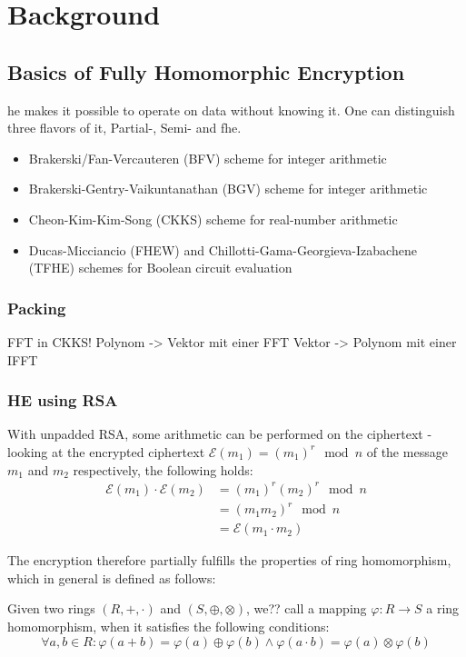 \chapter{Background}
\label{chap:background}

\section{Basics of Fully Homomorphic Encryption}
\gls{he} makes it possible to operate on data without knowing it.
One can distinguish three flavors of it, Partial-, Semi- and \gls{fhe}.

\begin{itemize}
    \item Brakerski/Fan-Vercauteren (BFV) scheme for integer arithmetic
    \item Brakerski-Gentry-Vaikuntanathan (BGV) scheme for integer arithmetic
    \item Cheon-Kim-Kim-Song (CKKS) scheme for real-number arithmetic
    \item Ducas-Micciancio (FHEW) and Chillotti-Gama-Georgieva-Izabachene (TFHE) schemes for Boolean circuit evaluation
\end{itemize}

\subsection{Packing}
FFT in CKKS!
Polynom -> Vektor mit einer FFT
Vektor -> Polynom mit einer IFFT

\subsection{HE using RSA}
With unpadded RSA, some arithmetic can be performed on the ciphertext - looking at the encrypted ciphertext $\mathcal{E}(m_1) = (m_1)^r \mod n$ of the message $m_1$ and $m_2$ respectively, the following holds:
\begin{align}
    \mathcal{E}(m_1) \cdot \mathcal{E}(m_2)
    &= (m_1)^r (m_2)^r \mod n \\
    &= (m_1 m_2)^r \mod n \\
    &= \mathcal{E}(m_1 \cdot m_2)
\end{align}

The encryption therefore partially fulfills the properties of ring homomorphism, which in general is defined as follows:

\begin{definition}
    Given two rings $(R, +, \cdot)$ and $(S, \oplus, \otimes)$, we?? call a mapping $\varphi: R \rightarrow S$ a ring homomorphism, when it satisfies the following conditions:
    $$\forall a, b \in R: \varphi(a + b) = \varphi(a) \oplus \varphi(b) \wedge \varphi(a \cdot b) = \varphi(a) \otimes \varphi(b)$$
\end{definition}

